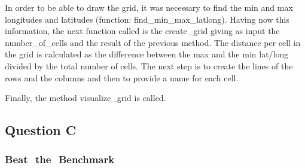 \documentclass[12pt]{article}
\begin{document}
	In order to be able to draw the grid, it was necessary to find the min and max longitudes and latitudes (function: find\_min\_max\_latlong). Having now this information, the next function called is the create\_grid giving as input the number\_of\_cells and the result of the previous method. The distance per cell in the grid is calculated as the difference between the max and the min lat/long divided by the total number of cells. The next step is to create the lines of the rows and the columns and then to provide a name for each cell.
	
	Finally, the method visualize\_grid is called.
	
	\subsection{Question C}
	
	
	\subsubsection{Beat ​ ​the ​ ​Benchmark}
	
	\newpage
	\begin{thebibliography}{30}
    \end{thebibliography}
	
\end{document}
